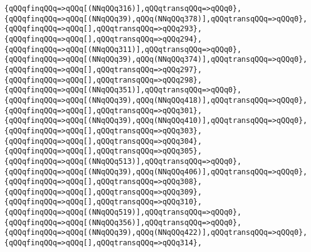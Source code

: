 \verb|{qQQqfinqQQq=>qQQq[(NNqQQq316)],qQQqtransqQQq=>qQQq0},|\newline
\verb|{qQQqfinqQQq=>qQQq[(NNqQQq39),qQQq(NNqQQq378)],qQQqtransqQQq=>qQQq0},|\newline
\verb|{qQQqfinqQQq=>qQQq[],qQQqtransqQQq=>qQQq293},|\newline
\verb|{qQQqfinqQQq=>qQQq[],qQQqtransqQQq=>qQQq294},|\newline
\verb|{qQQqfinqQQq=>qQQq[(NNqQQq311)],qQQqtransqQQq=>qQQq0},|\newline
\verb|{qQQqfinqQQq=>qQQq[(NNqQQq39),qQQq(NNqQQq374)],qQQqtransqQQq=>qQQq0},|\newline
\verb|{qQQqfinqQQq=>qQQq[],qQQqtransqQQq=>qQQq297},|\newline
\verb|{qQQqfinqQQq=>qQQq[],qQQqtransqQQq=>qQQq298},|\newline
\verb|{qQQqfinqQQq=>qQQq[(NNqQQq351)],qQQqtransqQQq=>qQQq0},|\newline
\verb|{qQQqfinqQQq=>qQQq[(NNqQQq39),qQQq(NNqQQq418)],qQQqtransqQQq=>qQQq0},|\newline
\verb|{qQQqfinqQQq=>qQQq[],qQQqtransqQQq=>qQQq301},|\newline
\verb|{qQQqfinqQQq=>qQQq[(NNqQQq39),qQQq(NNqQQq410)],qQQqtransqQQq=>qQQq0},|\newline
\verb|{qQQqfinqQQq=>qQQq[],qQQqtransqQQq=>qQQq303},|\newline
\verb|{qQQqfinqQQq=>qQQq[],qQQqtransqQQq=>qQQq304},|\newline
\verb|{qQQqfinqQQq=>qQQq[],qQQqtransqQQq=>qQQq305},|\newline
\verb|{qQQqfinqQQq=>qQQq[(NNqQQq513)],qQQqtransqQQq=>qQQq0},|\newline
\verb|{qQQqfinqQQq=>qQQq[(NNqQQq39),qQQq(NNqQQq406)],qQQqtransqQQq=>qQQq0},|\newline
\verb|{qQQqfinqQQq=>qQQq[],qQQqtransqQQq=>qQQq308},|\newline
\verb|{qQQqfinqQQq=>qQQq[],qQQqtransqQQq=>qQQq309},|\newline
\verb|{qQQqfinqQQq=>qQQq[],qQQqtransqQQq=>qQQq310},|\newline
\verb|{qQQqfinqQQq=>qQQq[(NNqQQq519)],qQQqtransqQQq=>qQQq0},|\newline
\verb|{qQQqfinqQQq=>qQQq[(NNqQQq356)],qQQqtransqQQq=>qQQq0},|\newline
\verb|{qQQqfinqQQq=>qQQq[(NNqQQq39),qQQq(NNqQQq422)],qQQqtransqQQq=>qQQq0},|\newline
\verb|{qQQqfinqQQq=>qQQq[],qQQqtransqQQq=>qQQq314},|\newline
